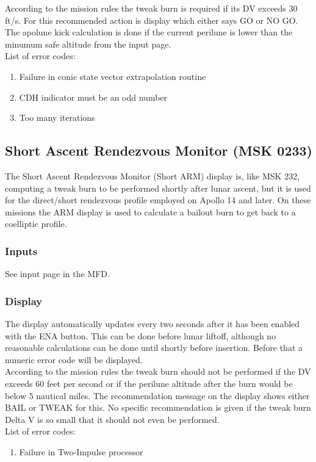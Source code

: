 \documentclass[11pt]{article} %
\begin{document}
According to the mission rules the tweak burn is required if its DV exceeds 30 ft/s. For this recommended action is display which either says GO or NO GO. The apolune kick calculation is done if the current perilune is lower than the minumum safe altitude from the input page.\\

List of error codes:
\begin{enumerate}
	\item Failure in conic state vector extrapolation routine
	\item CDH indicator must be an odd number
	\item Too many iterations
\end{enumerate}
\newpage
\subsection{Short Ascent Rendezvous Monitor (MSK 0233)}

The Short Ascent Rendezvous Monitor (Short ARM) display is, like MSK 232, computing a tweak burn to be performed shortly after lunar ascent, but it is used for the direct/short rendezvous profile employed on Apollo 14 and later. On these missions the ARM display is used to calculate a bailout burn to get back to a coelliptic profile.
\subsubsection{Inputs}
See input page in the MFD.
\subsubsection{Display}
The display automatically updates every two seconds after it has been enabled with the ENA button. This can be done before lunar liftoff, although no reasonable calculations can be done until shortly before insertion. Before that a numeric error code will be displayed.\\

According to the mission rules the tweak burn should not be performed if the DV exceeds 60 feet per second or if the perilune altitude after the burn would be below 5 nautical miles. The recommendation message on the display shows either BAIL or TWEAK for this. No specific recommendation is given if the tweak burn Delta V is so small that it should not even be performed.\\

List of error codes:
\begin{enumerate}
	\item Failure in Two-Impulse processor
\end{enumerate}
\newpage
\end{document}

